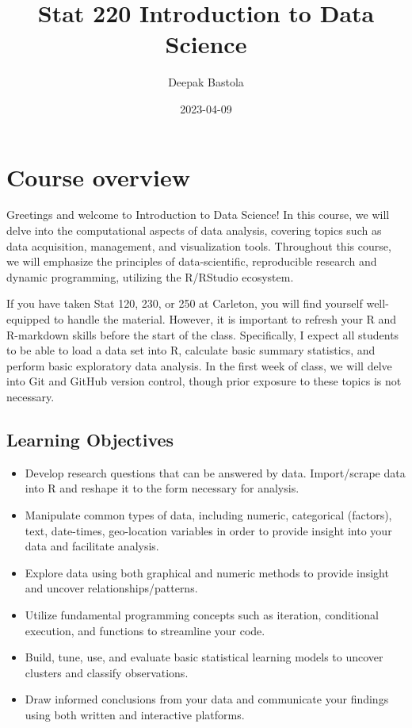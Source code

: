 \documentclass[
]{book}
\title{Stat 220 Introduction to Data Science}
\author{Deepak Bastola}
\date{2023-04-09}
\providecommand{\tightlist}{%
  \setlength{\itemsep}{0pt}\setlength{\parskip}{0pt}}
\begin{document}
\maketitle

{
\setcounter{tocdepth}{1}
\tableofcontents
}
\hypertarget{course-overview}{%
\chapter*{Course overview}\label{course-overview}}

Greetings and welcome to Introduction to Data Science! In this course, we will delve into the computational aspects of data analysis, covering topics such as data acquisition, management, and visualization tools. Throughout this course, we will emphasize the principles of data-scientific, reproducible research and dynamic programming, utilizing the R/RStudio ecosystem.

If you have taken Stat 120, 230, or 250 at Carleton, you will find yourself well-equipped to handle the material. However, it is important to refresh your R and R-markdown skills before the start of the class. Specifically, I expect all students to be able to load a data set into R, calculate basic summary statistics, and perform basic exploratory data analysis. In the first week of class, we will delve into Git and GitHub version control, though prior exposure to these topics is not necessary.

\hypertarget{learning-objectives}{%
\section{Learning Objectives}\label{learning-objectives}}

\begin{itemize}
\tightlist
\item
  Develop research questions that can be answered by data. Import/scrape data into R and reshape it to the form necessary for analysis.
\item
  Manipulate common types of data, including numeric, categorical (factors), text, date-times, geo-location variables in order to provide insight into your data and facilitate analysis.
\item
  Explore data using both graphical and numeric methods to provide insight and uncover relationships/patterns.
\item
  Utilize fundamental programming concepts such as iteration, conditional execution, and functions to streamline your code.
\item
  Build, tune, use, and evaluate basic statistical learning models to uncover clusters and classify observations.
\item
  Draw informed conclusions from your data and communicate your findings using both written and interactive platforms.
\end{itemize}
\end{document}
